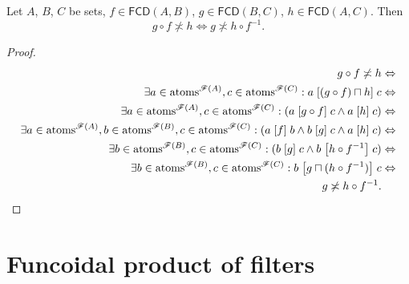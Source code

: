 \begin{thm}
\label{fcd-cross}Let $A$, $B$, $C$ be sets, $f\in\mathsf{FCD}(A,B)$,
$g\in\mathsf{FCD}(B,C)$, $h\in\mathsf{FCD}(A,C)$. Then
\[
g\circ f\nasymp h\Leftrightarrow g\nasymp h\circ f^{-1}.
\]
\end{thm}
\begin{proof}
~
\begin{align*}
g\circ f\not\asymp h & \Leftrightarrow\\
\exists a\in\operatorname{atoms}^{\mathscr{F}(A)},c\in\operatorname{atoms}^{\mathscr{F}(C)}:a\mathrel{\left[(g\circ
f)\sqcap h\right]}c & \Leftrightarrow\\
\exists a\in\operatorname{atoms}^{\mathscr{F}(A)},c\in\operatorname{atoms}^{\mathscr{F}(C)}:(a\mathrel{\left[g\circ
f\right]}c\land a\mathrel{\left[h\right]}c) & \Leftrightarrow\\
\exists
a\in\operatorname{atoms}^{\mathscr{F}(A)},b\in\operatorname{atoms}^{\mathscr{F}(B)},c\in\operatorname{atoms}^{\mathscr{F}
(C)}:(a\mathrel{\left[f\right]}b\land b\mathrel{\left[g\right]}c\land a\mathrel{\left[h\right]}c) & \Leftrightarrow\\
\exists b\in\operatorname{atoms}^{\mathscr{F}(B)},c\in\operatorname{atoms}^{\mathscr{F}(C)}:(b\mathrel{\left[g\right]}c\land b\mathrel{\left[h\circ f^{-1}\right]}c) & \Leftrightarrow\\
\exists
b\in\operatorname{atoms}^{\mathscr{F}(B)},c\in\operatorname{atoms}^{\mathscr{F}(C)}:b\mathrel{\left[g\sqcap(h\circ
f^{-1})\right]}c & \Leftrightarrow\\
g\not\asymp h\circ f^{-1}.
\end{align*}

\end{proof}

\section{Funcoidal product of filters}


